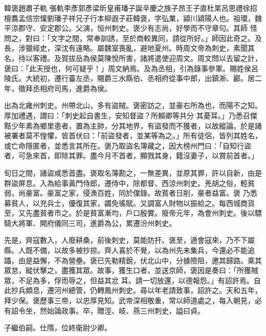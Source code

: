 
\begin{pinyinscope}

 韓褒趙肅子軌
 張軌李彥郭彥梁昕皇甫璠子誕辛慶之族子昂王子直杜杲呂思禮徐招檀翥孟信宗懍劉璠子祥兄子行本柳遐子莊韓褒，字弘業，潁川潁陽人也。祖環，魏平涼郡守、安定郡公。父演，恒州刺史。褒少有志尚，好學而不守章句。其師
 怪問之，對曰：「文字之間，常奉訓誘，至於商較異同，請從所好。」師因此奇之。及長，涉獵經史，深沈有遠略。屬魏室喪亂，避地夏州。時周文帝為刺史，素聞其名，待以客禮。及賀拔岳為侯莫陳悅所害，諸將遣使迎周文。周文問以去留之計，褒曰：「此天授也，何可疑乎！」周文納焉。及為丞相，引為錄事參軍。賜姓侯呂陵氏。大統初，遷行臺左丞，賜爵三水縣伯、丞相府從事中郎，出鎮淅、酈。居二年，徵拜丞相府司馬，進爵為侯。



 出為北雍州刺史。州帶北山，多有盜賊。褒密訪之，並豪右所為也，而陽不之知。厚加禮遇，謂曰：「刺史起自書生，安知督盜？所賴卿等共分
 其憂耳。」乃悉召傑黠少年素為鄉里患者，置為主帥，分其地界，有盜發而不獲者，以故縱論。於是諸被署者莫不惶懼，皆首伏曰：「前盜發者，並某等為之。」所有徒侶，皆列其姓名，或亡命隱匿者，並悉言其所在。褒乃取盜名簿藏之，因大榜州門曰：「自知行盜者，可急來首，即除其罪。盡今月不首者，顯戮其身，籍沒妻子，以賞前首者。」



 旬日之間，諸盜咸悉首盡。褒取名簿勘之，一無差異，並原其罪，許以自新，由是群盜屏息。入為給事黃門侍郎，遷侍中，除都督、西涼州刺史。羌胡之俗，輕貧弱，尚豪富。豪富之家，侵漁百姓，同於僕錄。故貧者日削，豪者益富。褒
 乃悉募貧人，以充兵士，優復其家，蠲免徭賦。又調富人財物以振給之。每西城商貨至，又先盡貧者市之。於是貧富漸均，戶口殷實。廢帝元年，為會州刺史。後以驃騎大將軍、開府儀同三司，進爵為公，累遷汾州刺史。



 先是，齊寇數入，人廢耕桑，前後刺史，莫能防扞。褒至，適會寇來，乃不下屬縣。人既不備，以故多被抄掠。齊人喜於不覺，以為州先未集兵，今還必不能追躡，由是益懈，不為營壘。褒已先勒精銳，伏北山中，分據險阻，邀其歸路。乘其眾怠，縱伏擊之，盡獲其眾。故事，獲生口者，並送京師，褒因是奏曰：「所獲賊眾，不足為多，俘而辱之，但益其忿
 耳。請一切放還，以德報怨。」有詔許焉。自此抄兵頗息，遷河州總管，仍轉鳳州刺史。尋以年老請致事，詔許之。天和五年，拜少保。褒歷事三帝，以忠厚見知。武帝深相敬重，常以師道處之，每入朝見，必有詔令坐，然始論政事。卒，贈涇、岐、燕三州刺史，謚曰貞。



 子繼伯嗣。仕隋，位終衛尉少卿。




\end{pinyinscope}
